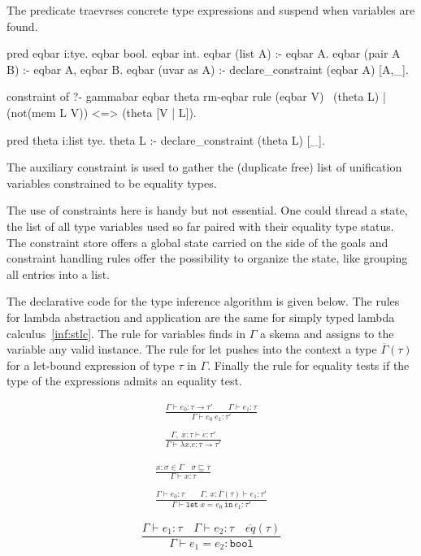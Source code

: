 \documentclass[a4paper, 11pt]{book}
\begin{document}
The  predicate traevrses concrete type expressions and
suspend when variables are found.

\begin{elpicode}
pred eqbar i:tye.
eqbar bool.
eqbar int.
eqbar (list A) :- eqbar A.
eqbar (pair A B) :- eqbar A, eqbar B.
eqbar (uvar as A) :- declare_constraint (eqbar A) [A,_].

constraint of ?- gammabar eqbar theta rm-eqbar {
  rule (eqbar V) \ (theta L) | (not(mem L V)) <=> (theta [V | L]).
}

pred theta i:list tye.
theta L :- declare_constraint (theta L) [_].
\end{elpicode}

The auxiliary constraint  is used to gather the
(duplicate free) list of unification variables constrained to be equality types.

The use of constraints here is handy but not essential. One could thread a state,
the list of all type variables used so far paired with their equality type status.
The constraint store offers a global state carried on the side of the goals
and constraint handling rules offer the possibility to organize the state, like grouping
all entries into a list.

The declarative code for the type inference algorithm is given below.
The rules for lambda abstraction and application are the same
for simply typed lambda calculus~\cref{inf:stlc}.
The rule for variables finds in $\Gamma$ a skema and assigns to the variable
any valid instance. The rule for let pushes into the context a type
$\overline{\Gamma}(\tau)$ for a let-bound expression of type $\tau$ in $\Gamma$.
Finally the rule for equality tests if the type of the expressions admits
an equality test.

\begin{center}
\begin{minipage}{0.45\textwidth}
$$
\begin{array}{cl}
  \displaystyle\frac{\Gamma \vdash e_0:\tau \rightarrow \tau' \quad\quad \Gamma \vdash e_1 : \tau }{\Gamma \vdash e_0\ e_1 : \tau'}\\ \\
  \displaystyle\frac{\Gamma,\;x:\tau\vdash e:\tau'}{\Gamma \vdash \lambda x.e : \tau \rightarrow \tau'}
\end{array}
  $$
\end{minipage}
\begin{minipage}{0.45\textwidth}
$$
\begin{array}{cl}
  \displaystyle\frac{x:\sigma \in \Gamma \quad \sigma \sqsubseteq \tau}{\Gamma \vdash x:\tau}\\ \\
  \displaystyle\frac{\Gamma \vdash e_0:\tau \quad\quad \Gamma,\,x:\bar{\Gamma}(\tau) \vdash e_1:\tau'}{\Gamma \vdash \mathtt{let}\ x = e_0\ \mathtt{in}\ e_1 :  \tau'}
  \end{array}
$$
\end{minipage}
$$ 
\displaystyle\frac{\Gamma \vdash e_1 : \tau \quad \Gamma \vdash e_2 : \tau \quad \overline{eq}(\tau)}{\Gamma \vdash e_1 = e_2: \mathtt{bool}}
$$
\end{center}
\end{document}
